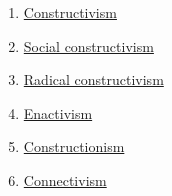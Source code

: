 \begin{enumerate}
\item
  \href{http://en.wikipedia.org/wiki/Constructivism\_(philosophy\_of\_education)}{Constructivism}
\item
  \href{http://en.wikipedia.org/wiki/Social\_constructivism}{Social
  constructivism}
\item
  \href{http://www.english.iup.edu/mmwimson/Syllabi/803/721/Radical\%20Constructivism\%20\%20\%20721.htm}{Radical
  constructivism}
\item
  \href{http://en.wikipedia.org/wiki/Enactivism\_(psychology)}{Enactivism}
\item
  \href{http://en.wikipedia.org/wiki/Constructionism\_(learning\_theory)}{Constructionism}
\item
  \href{http://en.wikipedia.org/wiki/Connectivism}{Connectivism}
\end{enumerate}

